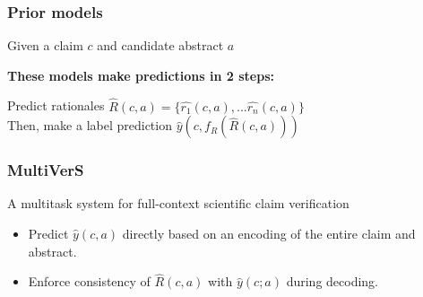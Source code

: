 \documentclass[13.5pt,aspecratio=169, xcolor=dvipsnames]{beamer}
\begin{document}
    

    \begin{frame}
        \onehalfspacing
        \frametitle{Prior models}

        \begin{minipage}{0.6\textwidth}
            \begin{block}{}
                Given a claim $c$ and candidate abstract $a$
            \end{block}
        \end{minipage}

        \bigskip
        
        \textbf{These models make predictions in 2 steps:}
        \vspace*{-1em} 
        \begin{mybox}
            Predict rationales $ \hat{R}(c,a) = \{ \hat{r_1}(c,a),... \hat{r_n}(c,a)\}$ \\
            Then, make a label prediction $\hat{y}(c, f_R(\hat{R}(c,a)))$
          \end{mybox}
    
    \end{frame}
        
    
    \begin{frame}
        \onehalfspacing
        \frametitle{MultiVerS}
        \begin{block}{A multitask system for full-context scientific claim verification}
            \begin{itemize}
                \item Predict $\hat{y}(c, a)$ directly based on an encoding of the entire claim and abstract.
                \item Enforce consistency of $\hat{R}(c, a)$ with $\hat{y}(c; a)$ during decoding.
            \end{itemize}
        \end{block}
    \end{frame}
        
\end{document}
